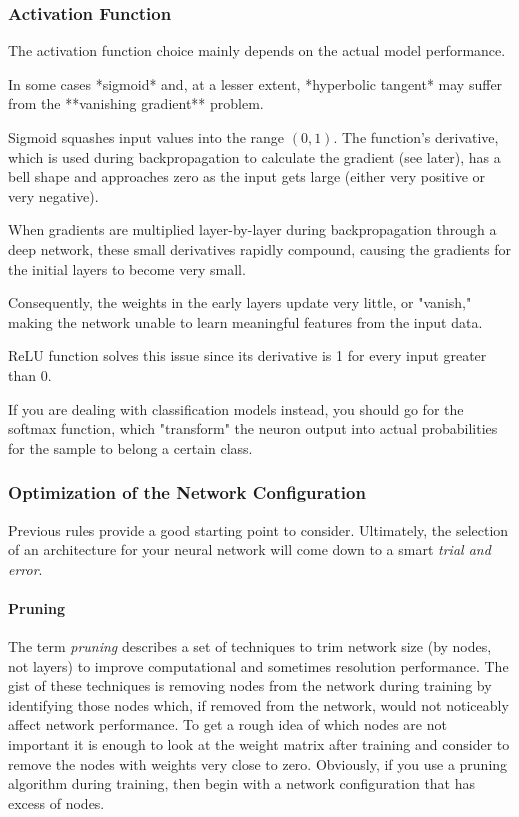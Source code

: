 \subsubsection{Activation Function}

The activation function choice mainly depends on the actual model performance.

In some cases *sigmoid* and, at a lesser extent, *hyperbolic tangent* may suffer from the **vanishing gradient** problem.

Sigmoid squashes input values into the range $(0,1)$. The function's derivative, which is used during backpropagation to calculate the gradient (see later), has a bell shape and approaches zero as the input gets large (either very positive or very negative).

When gradients are multiplied layer-by-layer during backpropagation through a deep network, these small derivatives rapidly compound, causing the gradients for the initial layers to become very small.

Consequently, the weights in the early layers update very little, or "vanish," making the network unable to learn meaningful features from the input data.

ReLU function solves this issue since its derivative is 1 for every input greater than 0.

If you are dealing with classification models instead, you should go for the softmax function, which "transform" the neuron output into actual probabilities for the sample to belong a certain class.

\subsubsection*{Optimization of the Network Configuration}

Previous rules provide a good starting point to consider. Ultimately, the selection of an architecture for your neural network will come down to a smart \emph{trial and error}. 

\paragraph{Pruning}
The term \emph{pruning} describes a set of techniques to trim network size (by nodes, not layers) to improve computational and sometimes resolution performance. 
The gist of these techniques is removing nodes from the network during training by identifying those nodes which, if removed from the network, would not noticeably affect network performance. To get a rough idea of which nodes are not important it is enough to look at the weight matrix after training and consider to remove the nodes with weights very close to zero. 
Obviously, if you use a pruning algorithm during training, then begin with a network configuration that has excess of nodes.


